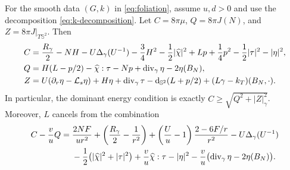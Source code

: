 \begin{lemma}\label{lem:constraints}
For the smooth data $(G,k)$ in \eqref{eq:foliation}, assume $u,d>0$
and use the decomposition \eqref{eq:k-decomposition}. Let
$C=8\pi\mu$, $Q=8\pi J(N)$, and $Z=8\pi J|_{T\mathbb S^2}$.
Then
\begin{equation}\label{eq:constraints}
 \begin{split}
 C={}&\frac{R_\gamma}{2}-NH-U\Delta_\gamma(U^{-1})
      -\frac34H^2-\frac12|\widehat\chi|^2
      +Lp+\frac14p^2-\frac12|\tau|^2-|\eta|^2,\\
 Q={}&H(L-p/2)-\widehat\chi:\tau-Np
      +\operatorname{div}_\gamma\eta-2\eta(B_N),\\
 Z={}&U(\partial_r\eta-\mathcal L_s\eta)+H\eta
      +\operatorname{div}_\gamma\tau-\mathrm d_{\mathbb S^2}(L+p/2)
      +(L\gamma-k_T)(B_N,\cdot).
 \end{split}
\end{equation}
In particular, the dominant energy condition is exactly
$C\ge\sqrt{Q^2+|Z|_\gamma^2}$. Moreover, $L$ cancels from the combination
\begin{equation}\label{eq:mass-identity}
 \begin{split}
 C-\frac vuQ={}&\frac{2NF}{ur^2}
  +\left(\frac{R_\gamma}{2}-\frac1{r^2}\right)
  +\left(\frac Uu-1\right)\frac{2-6F/r}{r^2}
  -U\Delta_\gamma(U^{-1})\\
 &-\frac12\bigl(|\widehat\chi|^2+|\tau|^2\bigr)
  +\frac vu\widehat\chi:\tau-|\eta|^2
  -\frac vu\bigl(\operatorname{div}_\gamma\eta-2\eta(B_N)\bigr).
 \end{split}
\end{equation}
\end{lemma}

